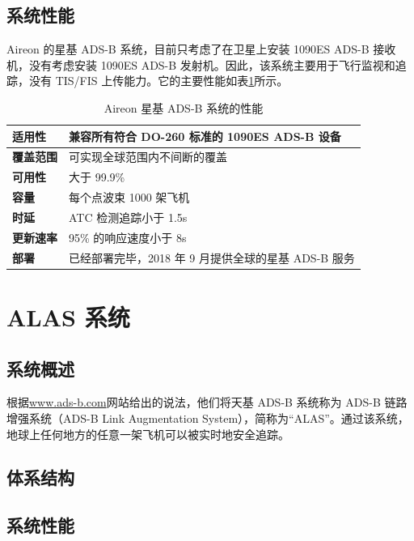 \subsection{系统性能}

Aireon 的星基 ADS-B 系统，目前只考虑了在卫星上安装 1090ES ADS-B 接收机，没有考虑安装 1090ES ADS-B 发射机。因此，该系统主要用于飞行监视和追踪，没有 TIS/FIS 上传能力。它的主要性能如表\ref{tab:aireon_ads-b_performance_para}所示。

\renewcommand\arraystretch{1.5}
\begin{table}[!htb]
\centering
\caption{Aireon 星基 ADS-B 系统的性能}
\label{tab:aireon_ads-b_performance_para}
\begin{tabular}[b]{|p{2.2cm}<{\raggedleft}|p{10.5cm}<{\raggedright}|}
\hline
\textbf{适用性} & 兼容所有符合 DO-260 标准的 1090ES ADS-B 设备 \\
\hline
\textbf{覆盖范围} & 可实现全球范围内不间断的覆盖 \\
\hline
\textbf{可用性} & 大于 99.9\% \\
\hline
\textbf{容量} & 每个点波束 1000 架飞机 \\
\hline
\textbf{时延} & ATC 检测追踪小于 1.5s \\
\hline
\textbf{更新速率} & 95\% 的响应速度小于 8s \\
\hline
\textbf{部署} & 已经部署完毕，2018 年 9 月提供全球的星基 ADS-B 服务 \\
\hline
\end{tabular}
\end{table}


\section{ALAS 系统}

\subsection{系统概述}

根据\url{www.ads-b.com}网站给出的说法，他们将天基 ADS-B 系统称为 ADS-B 链路增强系统（ADS-B Link Augmentation System），简称为“ALAS”。通过该系统，地球上任何地方的任意一架飞机可以被实时地安全追踪。

\subsection{体系结构}

\subsection{系统性能}


